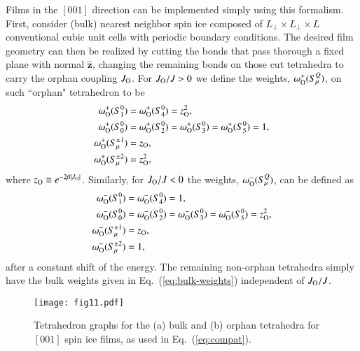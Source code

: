 \documentclass[aps,prx,reprint,runinaddress,superscriptaddress,amsmath,amssymb,floatfix,longbibliography]{revtex4-1}
\renewcommand{\vec}[1]{\boldsymbol{#1}}
\newcommand{\vhat}[1]{\vec{\hat{#1}}}
\newcommand{\Jo}{J_{\rm O}}
\begin{document}
Films in the $[001]$ direction can be implemented simply using this formalism. First, consider (bulk) nearest neighbor spin ice composed of $L_{\perp} \times L_{\perp} \times L$ conventional cubic unit cells with periodic boundary conditions. The desired film geometry can then be realized by cutting the bonds that pass thorough a fixed plane with normal $\vhat{z}$, changing the remaining bonds on those cut tetrahedra to carry the orphan coupling $\Jo$. For $\Jo/J>0$ we define the weights, $\omega^+_{\rm O}(S^Q_\mu)$, on such ``orphan" tetrahedron to be
\begin{align}
{\omega}^+_{\rm O}(S^{0}_1) &= {\omega}^+_{\rm O}(S^{0}_4) = z_{\rm O}^2,  \nonumber \\
{\omega}^+_{\rm O}(S^{0}_0) &= {\omega}^+_{\rm O}(S^{0}_2)={\omega}^+_{\rm O}(S^{0}_3)={\omega}^+_{\rm O}(S^{0}_5) = 1, \nonumber \\
{\omega}^+_{\rm O}(S^{\pm 1}_{\mu}) &= z_{\rm O}, \nonumber \\ 
{\omega}^+_{\rm O}(S^{\pm 2}_{\mu}) &= z_{\rm O}^2,
\end{align}
where $z_{\rm O} \equiv e^{-2\beta|\Jo|}$. Similarly, for $\Jo/J<0$ the weights, $\omega^-_{\rm O}(S^Q_\mu)$, can be defined as
\begin{align}
{\omega}^-_{\rm O}(S^{0}_1) &= {\omega}^-_{\rm O}(S^{0}_4) = 1,  \nonumber \\
{\omega}^-_{\rm O}(S^{0}_0) &= {\omega}^-_{\rm O}(S^{0}_2)={\omega}^-_{\rm O}(S^{0}_3)={\omega}^-_{\rm O}(S^{0}_5) = z_{\rm O}^2, \nonumber \\
{\omega}^-_{\rm O}(S^{\pm 1}_{\mu}) &= z_{\rm O}, \nonumber \\ 
{\omega}^-_{\rm O}(S^{\pm 2}_{\mu}) &= 1,
\end{align}
after a constant shift of the energy. The remaining non-orphan tetrahedra simply have the bulk weights given in Eq.~(\ref{eq:bulk-weights}) independent of $\Jo/J$.
\begin{figure}
  \centering
    \texttt{[image: fig11.pdf]}
    \caption{Tetrahedron graphs for the (a) bulk and (b) orphan tetrahedra for $[001]$ spin ice films, as used in Eq.~(\ref{eq:compat}).
	\label{fig:mc:graphs}
	}
\end{figure}
\end{document}
